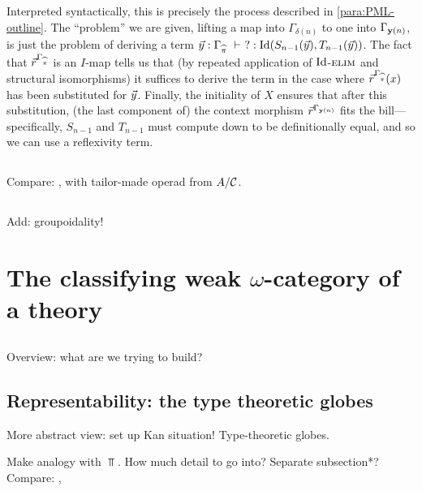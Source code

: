 Interpreted syntactically, this is precisely the process described in \PARA \ref{para:PML-outline}.  The ``problem'' we are given, lifting a map into $\Gamma_{\delta(n)}$ to one into $\Gamma_{\mathbf{y}(n)}$, is just the problem of deriving a term $\vec y : \Gamma_{\widehat{\pi}}\ \vdash\ ? : \mathrm{Id}(S_{n-1}(\vec y),T_{n-1}(\vec y))$.  The fact that $\vec r^{\Gamma_{\widehat{\pi}}}$ is an $I$-map tells us that (by repeated application of $\mathrm{Id}$-$\textsc{elim}$ and structural isomorphisms) it suffices to derive the term in the case where $\vec r^{\Gamma_{\widehat{\pi}}}(x)$ has been substituted for $\vec y$.  Finally, the initiality of $X$ ensures that after this substitution, (the last component of) the context morphism $\vec r^{\Gamma_{\mathbf{y}(n)}}$ fits the bill---specifically, $S_{n-1}$ and $T_{n-1}$ must compute down to be definitionally equal, and so we can use a reflexivity term.

\subsection*{} Compare: \cite{garner-van-den-berg}, with tailor-made operad from $A/\mathcal{C}$.

\subsection*{} Add: groupoidality!






\section{The classifying weak $\omega$-category of a theory}

\subsection*{} Overview: what are we trying to build?

\subsection*{Representability: the type theoretic globes} More abstract view: set  up Kan situation!  Type-theoretic globes.

Make analogy with $\Top$.  How much detail to go into?  Separate subsection*?  Compare: \cite[]{batanin:natural-environment}, 

